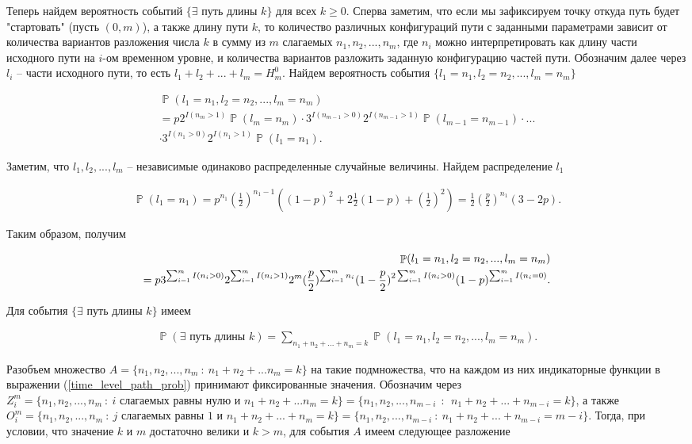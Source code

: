 \documentclass[10pt, reqno]{amsart}
\DeclareMathOperator*{\Pb}{\mathbb{P}}
\begin{document}
  Теперь найдем вероятность событий $\{\exists \text{ путь длины } k\}$ для всех $k \geq 0$. Сперва заметим, что если мы зафиксируем точку откуда путь будет "стартовать" (пусть $(0,m)$), а также длину пути $k$, то количество различных конфигураций пути с заданными параметрами зависит от количества вариантов разложения числа $k$ в сумму из $m$ слагаемых $n_{1}, n_{2},...,n_{m}$, где $n_{i}$ можно интерпретировать как длину части исходного пути на $i$-ом временном уровне, и количества вариантов разложить заданную конфигурацию частей пути. Обозначим далее через $l_{i}$ -- части исходного пути, то есть $l_{1}+l_{2}+...+l_{m} = H_{m}^{0}$. Найдем вероятность события $\{l_{1}=n_{1}, l_{2}=n_{2},..., l_{m}=n_{m}\}$
  
  \begin{align*}
    \Pb(l_{1}=n_{1}, l_{2}=n_{2},..., l_{m}=n_{m}) \\ = p2^{I(n_{m}>1)}\Pb(l_{m}=n_{m})\cdot3^{I(n_{m-1}>0)}2^{I(n_{m-1}>1)}\Pb(l_{m-1}=n_{m-1})\cdot...\\ \cdot3^{I(n_{1}>0)}2^{I(n_{1}>1)}\Pb(l_{1}=n_{1}).
  \end{align*}
  
  Заметим, что $l_{1}, l_{2},..., l_{m}$ -- независимые одинаково распределенные случайные величины. Найдем распределение $l_{1}$
  
  \begin{align*}
    \Pb(l_{1} = n_{1}) = p^{n_{1}}(\frac{1}{2})^{n_{1}-1}((1-p)^{2} + 2\frac{1}{2}(1-p) + (\frac{1}{2})^{2}) = \frac{1}{2}(\frac{p}{2})^{n_{1}}(3-2p).
  \end{align*}
  
  Таким образом, получим
  
  \begin{align}
    \Pb(l_{1}=n_{1}, l_{2}=n_{2},..., l_{m}=n_{m}) \notag\\ = p3^{\sum_{i=1}^{m}I(n_{i}>0)}2^{\sum_{i=1}^{m}I(n_{i}>1)}2^{m}(\frac{p}{2})^{\sum_{i=1}^{m}n_{i}}(1-\frac{p}{2})^{2\sum_{i=1}^{m}I(n_{i}>0)}(1-p)^{\sum_{i=1}^{m}I(n_{i}=0)}.
    \label{time_level_path_prob}
  \end{align}
  
  Для события $\{\exists \text{ путь длины } k\}$ имеем
  
  \begin{align*}
    \Pb(\exists \text{ путь длины } k) = \sum_{n_{1}+n_{2}+...+n_{m} = k}\Pb(l_{1}=n_{1}, l_{2}=n_{2},..., l_{m}=n_{m}).
  \end{align*}
  
  Разобъем множество $A = \{n_{1}, n_{2},..., n_{m} \: : \: n_{1}+n_{2}+...n_{m}=k\}$ на такие подмножества, что на каждом из них индикаторные функции в выражении (\ref{time_level_path_prob}) принимают фиксированные значения. Обозначим через $Z_{i}^{m} = \{n_{1}, n_{2},..., n_{m} \: : \: i \text{ слагаемых равны нулю и } n_{1}+n_{2}+...n_{m}=k\} = \{n_{1}, n_{2},..., n_{m-i} \:\: : \:\: n_{1}+n_{2}+...+n_{m-i}=k\}$, а также $O_{i}^{m} = \{n_{1}, n_{2},..., n_{m} \: : \: j \text{ слагаемых равны } 1 \text{ и } n_{1}+n_{2}+...+n_{m}=k\} = \{n_{1}, n_{2},..., n_{m-i} \: : \: n_{1}+n_{2}+...+n_{m-i}=m-i\}$. Тогда, при условии, что значение $k$ и $m$ достаточно велики и $k > m$, для события $A$ имеем следующее разложение
  
\end{document}
